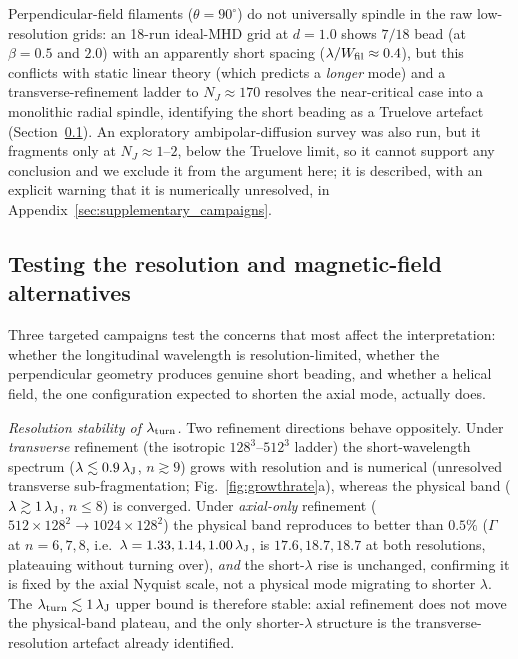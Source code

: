 \documentclass[usenatbib,twoside,twocolumn]{mnras}
\begin{document}
Perpendicular-field filaments ($\theta=90^\circ$) do not universally spindle in the raw low-resolution grids: an 18-run ideal-MHD grid at $d=1.0$ shows $7/18$ bead (at $\beta=0.5$ and $2.0$) with an apparently short spacing ($\lambda/W_{\rm fil}\approx0.4$), but this conflicts with static linear theory (which predicts a \emph{longer} mode) and a transverse-refinement ladder to $N_J\approx170$ resolves the near-critical case into a monolithic radial spindle, identifying the short beading as a Truelove artefact (Section~\ref{sec:optional_tests}). An exploratory ambipolar-diffusion survey was also run, but it fragments only at $N_J\approx1$--$2$, below the Truelove limit, so it cannot support any conclusion and we exclude it from the argument here; it is described, with an explicit warning that it is numerically unresolved, in Appendix~\ref{sec:supplementary_campaigns}.

\subsection{Testing the resolution and magnetic-field alternatives}
\label{sec:optional_tests}
Three targeted campaigns test the concerns that most affect the interpretation: whether the longitudinal wavelength is resolution-limited, whether the perpendicular geometry produces genuine short beading, and whether a helical field, the one configuration expected to shorten the axial mode, actually does.

\emph{Resolution stability of $\lambda_{\rm turn}$.} Two refinement directions behave oppositely. Under \emph{transverse} refinement (the isotropic $128^3$--$512^3$ ladder) the short-wavelength spectrum ($\lambda\lesssim0.9\,\lambda_{\rm J}$, $n\gtrsim9$) grows with resolution and is numerical (unresolved transverse sub-fragmentation; Fig.~\ref{fig:growthrate}a), whereas the physical band ($\lambda\gtrsim1\,\lambda_{\rm J}$, $n\leq8$) is converged. Under \emph{axial-only} refinement ($512\times128^2\to1024\times128^2$) the physical band reproduces to better than $0.5\%$ ($\Gamma$ at $n=6,7,8$, i.e.\ $\lambda=1.33,1.14,1.00\,\lambda_{\rm J}$, is $17.6,18.7,18.7$ at both resolutions, plateauing without turning over), \emph{and} the short-$\lambda$ rise is unchanged, confirming it is fixed by the axial Nyquist scale, not a physical mode migrating to shorter $\lambda$. The $\lambda_{\rm turn}\lesssim1\,\lambda_{\rm J}$ upper bound is therefore stable: axial refinement does not move the physical-band plateau, and the only shorter-$\lambda$ structure is the transverse-resolution artefact already identified.
\end{document}
